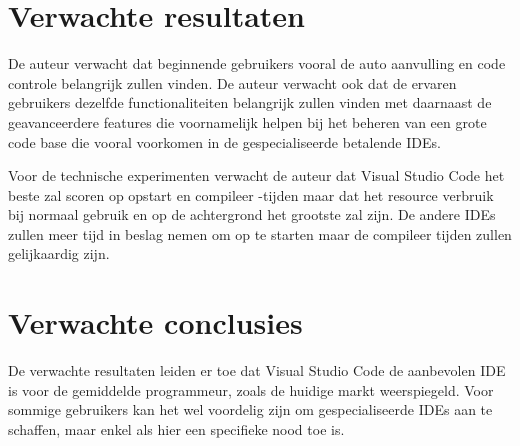 \section{Verwachte resultaten}
\label{sec:verwachte_resultaten}

De auteur verwacht dat beginnende gebruikers vooral de auto aanvulling en code controle belangrijk zullen vinden. De auteur verwacht ook dat de ervaren gebruikers dezelfde functionaliteiten belangrijk zullen vinden met daarnaast de geavanceerdere features die voornamelijk helpen bij het beheren van een grote code base die vooral voorkomen in de gespecialiseerde betalende IDEs.

Voor de technische experimenten verwacht de auteur dat Visual Studio Code het beste zal scoren op opstart en compileer -tijden maar dat het resource verbruik bij normaal gebruik en op de achtergrond het grootste zal zijn. De andere IDEs zullen meer tijd in beslag nemen om op te starten maar de compileer tijden zullen gelijkaardig zijn.



\section{Verwachte conclusies}
\label{sec:verwachte_conclusies}

De verwachte resultaten leiden er toe dat Visual Studio Code de aanbevolen IDE is voor de gemiddelde programmeur, zoals de huidige markt weerspiegeld. Voor sommige gebruikers kan het wel voordelig zijn om gespecialiseerde IDEs aan te schaffen, maar enkel als hier een specifieke nood toe is.

